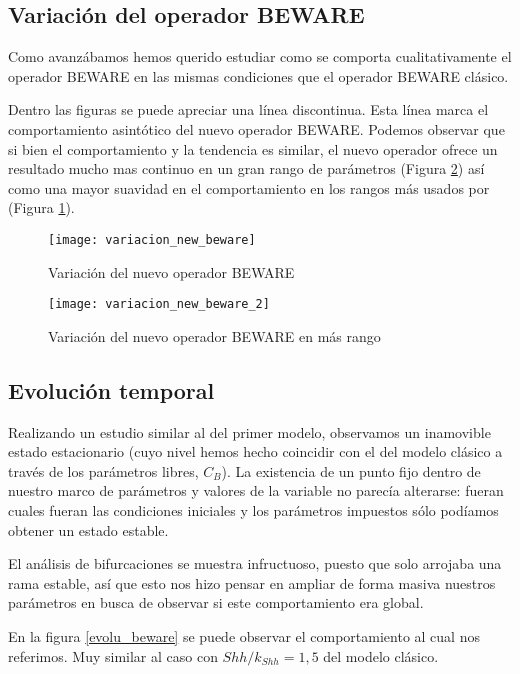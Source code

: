\subsection{Variación del operador BEWARE}
Como avanzábamos hemos querido estudiar como se comporta cualitativamente el operador BEWARE en las mismas condiciones que el operador BEWARE clásico.

Dentro las figuras se puede apreciar una línea discontinua. Esta línea marca el comportamiento asintótico del nuevo operador BEWARE.
 Podemos observar que si bien el comportamiento y la tendencia es similar, el nuevo operador ofrece un resultado mucho mas continuo en un gran rango de parámetros (Figura \ref{vari_beware_2}) así como una mayor suavidad en el comportamiento en los rangos más usados por \cite{schaffer} (Figura \ref{vari_beware}). 
\begin{figure}[h]
	\texttt{[image: variacion\_new\_beware]}
	\centering
	\caption{Variación del nuevo operador BEWARE }
	\label{vari_beware}
\end{figure}

\begin{figure}[h]
	\texttt{[image: variacion\_new\_beware\_2]}
	\centering
	\caption{Variación del nuevo operador BEWARE en más rango}
	\label{vari_beware_2}
\end{figure}

\subsection{Evolución temporal}

Realizando un estudio similar al del primer modelo, observamos un inamovible estado estacionario (cuyo nivel hemos hecho coincidir con el del modelo clásico a través de los parámetros libres, $C_B$). La existencia de un punto fijo dentro de nuestro marco de parámetros y valores de la variable no parecía alterarse: fueran cuales fueran las condiciones iniciales y los parámetros impuestos sólo podíamos obtener un estado estable. 

El análisis de bifurcaciones se muestra infructuoso, puesto que solo arrojaba una rama estable, así que esto nos hizo pensar en ampliar de forma masiva nuestros parámetros en busca de observar si este comportamiento era global.
 
 En la figura \ref{evolu_beware} se puede observar el comportamiento al cual nos referimos. Muy similar al caso con $Shh/k_{Shh}=1,5$ del modelo clásico.

